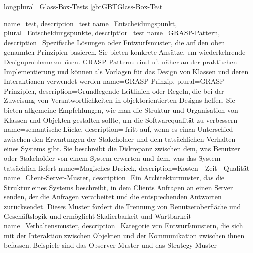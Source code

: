     longplural={Glass-Box-Tests}
]{gbt}{GBT}{Glass-Box-Test}






{
    name={test},
    description={test}
}
{
    name={Entscheidungspunkt},
    plural={Entscheidungspunkte},
    description={test}
}
{
    name={GRASP-Pattern},
    description={Spezifische Lösungen oder Entwurfsmuster, die auf den oben genannten Prinzipien basieren. Sie bieten konkrete Ansätze, um wiederkehrende Designprobleme zu lösen. GRASP-Patterns sind oft näher an der praktischen Implementierung und können als Vorlagen für das Design von Klassen und deren Interaktionen verwendet werden}
}
{
    name={GRASP-Prinzip},
    plural={GRASP-Prinzipien},
    description={Grundlegende Leitlinien oder Regeln, die bei der Zuweisung von Verantwortlichkeiten in objektorientierten Designs helfen. Sie bieten allgemeine Empfehlungen, wie man die Struktur und Organisation von Klassen und Objekten gestalten sollte, um die Softwarequalität zu verbessern}
}
{
    name={semantische Lücke},
    description={Tritt auf, wenn es einen Unterschied zwischen den Erwartungen der Stakeholder und dem tatsächlichen Verhalten eines Systems gibt. Sie beschreibt die Diskrepanz zwischen dem, was Benutzer oder Stakeholder von einem System erwarten und dem, was das System tatsächlich liefert}
}
{
    name={Magisches Dreieck},
    description={Kosten - Zeit - Qualität}
}
{
    name={Client-Server-Muster},
    description={Ein Architekturmuster, das die Struktur eines Systems beschreibt, in dem Clients Anfragen an einen Server senden, der die Anfragen verarbeitet und die entsprechenden Antworten zurücksendet. Dieses Muster fördert die Trennung von Benutzeroberfläche und Geschäftslogik und ermöglicht Skalierbarkeit und Wartbarkeit}
}
{
    name={Verhaltensmuster},
    description={Kategorie von Entwurfsmustern, die sich mit der Interaktion zwischen Objekten und der Kommunikation zwischen ihnen befassen. Beispiele sind das Observer-Muster und das Strategy-Muster}
}
